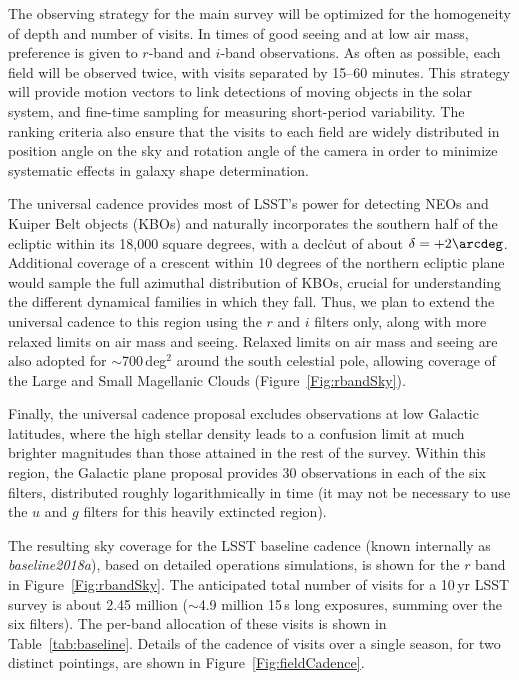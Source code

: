 The observing strategy for the main survey will be optimized for the homogeneity
of depth and number of visits. In times of good seeing and at low air mass, preference
is given to $r$-band and $i$-band observations. As often as possible, each field will be
observed twice, with visits separated by 15--60 minutes. This strategy will provide motion
vectors to link detections of moving objects in the solar system, and fine-time sampling
for measuring short-period variability. The ranking criteria also ensure that the
visits to each field are widely distributed in position angle on the sky and
rotation angle of the camera in order to minimize systematic effects in galaxy shape
determination.

The universal cadence provides most of LSST's power for detecting
NEOs and Kuiper Belt objects (KBOs) and naturally
incorporates the southern half of the ecliptic
within its 18,000 square degrees, with a decl\. cut of about
$\delta = +2\arcdeg$.  Additional coverage of a crescent within 10
degrees of the northern
ecliptic plane would sample the full azimuthal distribution of KBOs,
crucial for understanding the different dynamical families in which
they fall.
Thus, we plan to extend
the universal cadence to this region using the
$r$ and $i$ filters only, along
with more relaxed limits on air mass and seeing. Relaxed limits on air mass and
seeing are also adopted for $\sim$700\,deg$^2$ around the south celestial
pole, allowing coverage of the Large and Small Magellanic Clouds
(Figure~\ref{Fig:rbandSky}).

Finally, the universal cadence proposal excludes observations at low
Galactic latitudes, where the high stellar
density leads to a confusion limit at much brighter magnitudes than those
attained in the rest of the survey. Within this region, the Galactic plane
proposal provides 30 observations in each of the six filters, distributed
roughly logarithmically in time (it may not be necessary to use the
$u$ and $g$ filters for this heavily extincted region).

The resulting sky coverage for the LSST baseline cadence (known internally as
\textit{baseline2018a}), based on detailed operations simulations, is shown for the
$r$ band in Figure~\ref{Fig:rbandSky}. The anticipated total number of visits
for a 10\,yr LSST survey  is about 2.45 million ($\sim$4.9 million 15\,s long
exposures, summing over the six filters). The per-band allocation of
these visits is shown in Table~\ref{tab:baseline}.  Details of the cadence of visits
over a single season, for two distinct pointings, are shown in Figure~\ref{Fig:fieldCadence}.

